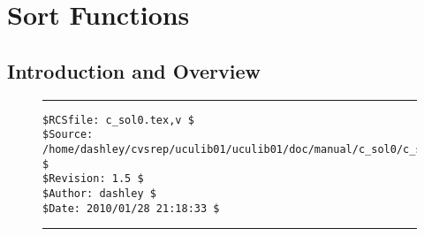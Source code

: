 
\chapter[Sort Functions]
        {Sort Functions}

\label{csol0}

\section{Introduction and Overview}
\label{csol0:siov0}



\noindent\begin{figure}[!b]
\noindent\rule[-0.25in]{\textwidth}{1pt}
\begin{tiny}
\begin{verbatim}
$RCSfile: c_sol0.tex,v $
$Source: /home/dashley/cvsrep/uculib01/uculib01/doc/manual/c_sol0/c_sol0.tex,v $
$Revision: 1.5 $
$Author: dashley $
$Date: 2010/01/28 21:18:33 $
\end{verbatim}
\end{tiny}
\noindent\rule[0.25in]{\textwidth}{1pt}
\end{figure}

%
%
%
%
%


